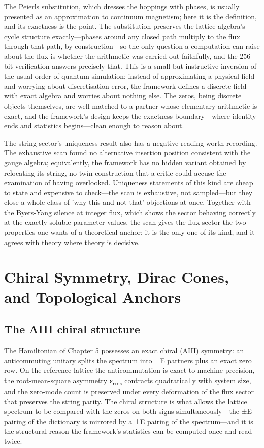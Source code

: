 \documentclass[10pt]{article}
\begin{document}
The Peierls substitution, which dresses the hoppings with phases, is usually presented as an approximation to continuum magnetism; here it is the definition, and its exactness is the point. The substitution preserves the lattice algebra's cycle structure exactly---phases around any closed path multiply to the flux through that path, by construction---so the only question a computation can raise about the flux is whether the arithmetic was carried out faithfully, and the 256-bit verification answers precisely that. This is a small but instructive inversion of the usual order of quantum simulation: instead of approximating a physical field and worrying about discretisation error, the framework defines a discrete field with exact algebra and worries about nothing else. The zeros, being discrete objects themselves, are well matched to a partner whose elementary arithmetic is exact, and the framework's design keeps the exactness boundary---where identity ends and statistics begins---clean enough to reason about.

The string sector's uniqueness result also has a negative reading worth recording. The exhaustive scan found no alternative insertion position consistent with the gauge algebra; equivalently, the framework has no hidden variant obtained by relocating its string, no twin construction that a critic could accuse the examination of having overlooked. Uniqueness statements of this kind are cheap to state and expensive to check---the scan is exhaustive, not sampled---but they close a whole class of 'why this and not that' objections at once. Together with the Byers-Yang silence at integer flux, which shows the sector behaving correctly at the exactly soluble parameter values, the scan gives the flux sector the two properties one wants of a theoretical anchor: it is the only one of its kind, and it agrees with theory where theory is decisive.

\section{Chiral Symmetry, Dirac Cones, and Topological Anchors}\label{sec:ch6}
\subsection{The AIII chiral structure}\label{sec:61}
The Hamiltonian of Chapter 5 possesses an exact chiral (AIII) symmetry: an anticommuting unitary splits the spectrum into ±E partners plus an exact zero row. On the reference lattice the anticommutation is exact to machine precision, the root-mean-square asymmetry ε\textsubscript{rms} contracts quadratically with system size, and the zero-mode count is preserved under every deformation of the flux sector that preserves the string parity. The chiral structure is what allows the lattice spectrum to be compared with the zeros on both signs simultaneously---the ±E pairing of the dictionary is mirrored by a ±E pairing of the spectrum---and it is the structural reason the framework's statistics can be computed once and read twice.
\end{document}
